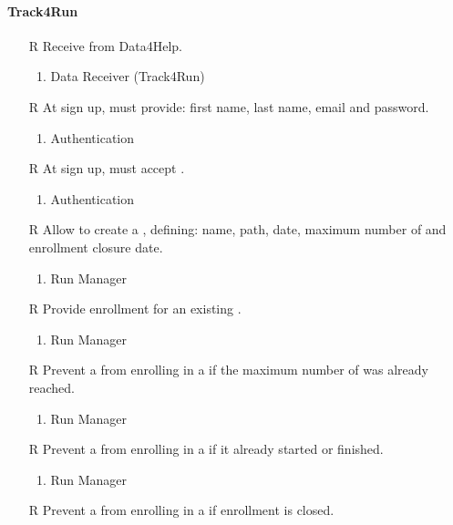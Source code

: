 \paragraph{Track4Run}
\begin{itemize}
	\item[R\subs{40}]Receive  from Data4Help.
	\begin{enumerate}
		\item Data Receiver (Track4Run)
	\end{enumerate}
	\item[R\subs{41}]At sign up,  must provide: first name, last name, email and password.
	\begin{enumerate}
		\item Authentication
	\end{enumerate}
	\item[R\subs{42}]At sign up,  must accept .
	\begin{enumerate}
		\item Authentication
	\end{enumerate}
	\item[R\subs{43}]Allow  to create a , defining: name, path, date, maximum number of  and enrollment closure date.
	\begin{enumerate}
		\item Run Manager
	\end{enumerate}
	\item[R\subs{44}]Provide  enrollment for an existing .
	\begin{enumerate}
		\item Run Manager
	\end{enumerate}
	\item[R\subs{45}]Prevent a  from enrolling in a  if the maximum number of  was already reached.
	\begin{enumerate}
		\item Run Manager
	\end{enumerate}
	\item[R\subs{46}]Prevent a  from enrolling in a  if it already started or finished.
	\begin{enumerate}
		\item Run Manager
	\end{enumerate}
	\item[R\subs{47}]Prevent a  from enrolling in a  if enrollment is closed.

\end{itemize}

